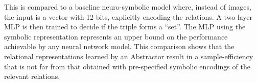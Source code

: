 This is compared to a baseline neuro-symbolic model where, instead of images, the input is a vector with 12 bits,
explicitly encoding the relations.
A two-layer MLP is then trained to decide if the triple forms a ``set''. The MLP using the symbolic representation represents an upper bound on the performance achievable by any neural network model. This comparison shows that the relational representations learned by an Abstractor result in a sample-efficiency that is not far from that obtained with pre-specified symbolic encodings of the relevant relations.



